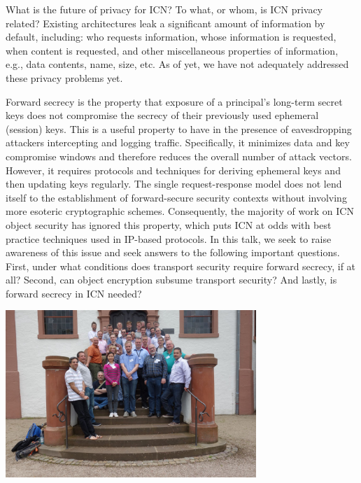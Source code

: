 \documentclass[a4paper,UKenglish]{dagrep}
\begin{document}
\license

What is the future of privacy for ICN? To what, or whom, is ICN privacy related? Existing architectures leak a significant amount of information by default, including: who requests information, whose information is requested, when content is requested, and other miscellaneous properties of information, e.g., data contents, name, size, etc. As of yet, we have not adequately addressed these privacy problems yet.

\license

Forward secrecy is the property that exposure of a principal's long-term secret keys does not compromise the secrecy of their previously used ephemeral (session) keys. This is a useful property to have in the presence of eavesdropping attackers intercepting and logging traffic. Specifically, it minimizes data and key compromise windows and therefore reduces the overall number of attack vectors. However, it requires protocols and techniques for deriving ephemeral keys and then updating keys regularly. The single request-response model does not lend itself to the establishment of forward-secure security contexts without involving more esoteric cryptographic schemes. Consequently, the majority of work on ICN object security has ignored this property, which puts ICN at odds with best practice techniques used in IP-based protocols. In this talk, we seek to raise awareness of this issue and seek answers to the following important questions. First, under what conditions does transport security require forward secrecy, if at all? Second, can object encryption subsume transport security? And lastly, is forward secrecy in ICN needed?


\vfill

\begin{center}
\includegraphics[width=0.71\textwidth]{16251.jpg}
\end{center}
\end{document}
